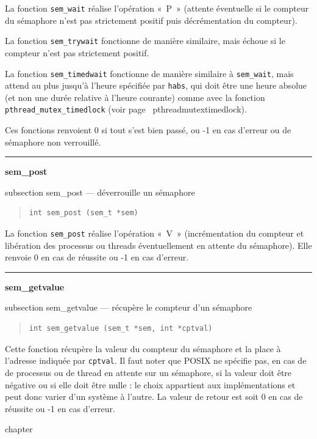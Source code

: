 \documentclass [twoside] {report}
\newcommand {\primitive} [1]
    {
	\phantomsection
	{\large \textbf {#1}}
	\addcontentsline {toc} {subsection} {#1}
    }
\newcommand {\separation}
    {
	\vspace {5mm}
	\nopagebreak
	\hrule
    }
\begin{document}
La fonction \verb|sem_wait| réalise l'opération «~P~» (attente
éventuelle si le compteur du sémaphore n'est pas strictement positif
puis décrémentation du compteur).

La fonction \verb|sem_trywait| fonctionne de manière similaire,
mais échoue si le compteur n'est pas strictement positif.

La fonction \verb|sem_timedwait| fonctionne de manière similaire à
\verb|sem_wait|, mais attend au plus jusqu'à l'heure spécifiée par
\texttt {habs}, qui doit être une heure absolue (et non une durée
relative à l'heure courante) comme avec la fonction
\verb|pthread_mutex_timedlock| (voir page~\pageref
{pthreadmutextimedlock}).

Ces fonctions renvoient 0 si tout s'est bien passé, ou -1 en cas d'erreur
ou de sémaphore non verrouillé.


\separation
\primitive {sem\_post} --- déverrouille un sémaphore

\begin {quote}
\begin {verbatim}
int sem_post (sem_t *sem)
\end{verbatim}
\end {quote}

La fonction \verb|sem_post| réalise l'opération «~V~» (incrémentation
du compteur et libération des processus ou threads éventuellement
en attente du sémaphore). Elle renvoie 0 en cas de réussite ou -1 en
cas d'erreur.


\separation
\primitive {sem\_getvalue} --- récupère le compteur d'un sémaphore

\begin {quote}
\begin {verbatim}
int sem_getvalue (sem_t *sem, int *cptval)
\end{verbatim}
\end {quote}

Cette fonction récupère la valeur du compteur du sémaphore et la
place à l'adresse indiquée par \texttt {cptval}. Il faut noter que
POSIX ne spécifie pas, en cas de de processus ou de thread en attente
sur un sémaphore, si la valeur doit être négative ou si elle doit
être nulle : le choix appartient aux implémentations et peut donc
varier d'un système à l'autre. La valeur de retour est soit 0 en cas
de réussite ou -1 en cas d'erreur.



% 
% 



\appendix
\cleardoublepage
{}			%
 {chapter} {\indexname}
\printindex
\end{document}
